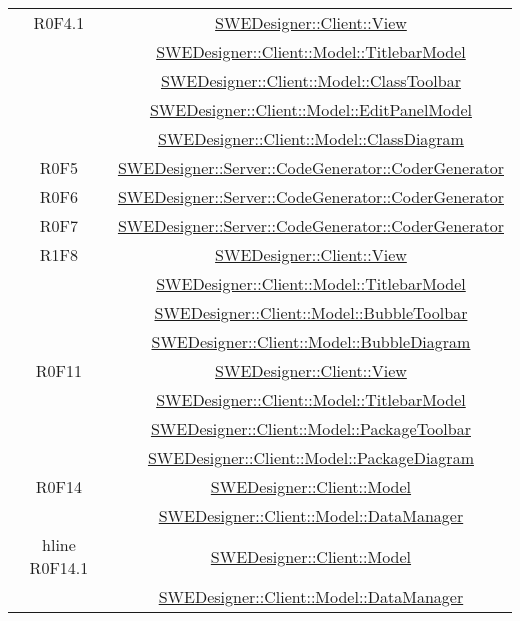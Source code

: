 \documentclass[../SpecificaTecnica.tex]{subfiles}
\begin{document}
\begin{longtable}{|c|c|}
		R0F4.1 & \hyperlink{SWEDesigner::Client::View}{SWEDesigner::Client::View} \\& \hyperlink{SWEDesigner::Client::Model::TitlebarModel}{SWEDesigner::Client::Model::TitlebarModel} \\& \hyperlink{SWEDesigner::Client::Model::ClassToolbar}{SWEDesigner::Client::Model::ClassToolbar} \\& \hyperlink{SWEDesigner::Client::Model::EditPanelModel}{SWEDesigner::Client::Model::EditPanelModel} \\& \hyperlink{SWEDesigner::Client::Model::ClassDiagram}{SWEDesigner::Client::Model::ClassDiagram}\\\hline
		R0F5 & \hyperlink{SWEDesigner::Server::CodeGenerator::CoderGenerator}{SWEDesigner::Server::CodeGenerator::CoderGenerator} \\\hline
		R0F6 & \hyperlink{SWEDesigner::Server::CodeGenerator::CoderGenerator}{SWEDesigner::Server::CodeGenerator::CoderGenerator}\\\hline
		R0F7 & \hyperlink{SWEDesigner::Server::CodeGenerator::CoderGenerator}{SWEDesigner::Server::CodeGenerator::CoderGenerator}\\\hline
		R1F8 & \hyperlink{SWEDesigner::Client::View}{SWEDesigner::Client::View} \\& \hyperlink{SWEDesigner::Client::Model::TitlebarModel}{SWEDesigner::Client::Model::TitlebarModel} \\& \hyperlink{SWEDesigner::Client::Model::BubbleToolbar}{SWEDesigner::Client::Model::BubbleToolbar} \\& \hyperlink{SWEDesigner::Client::Model::BubbleDiagram}{SWEDesigner::Client::Model::BubbleDiagram} \\\hline
		R0F11 & \hyperlink{SWEDesigner::Client::View}{SWEDesigner::Client::View} \\& \hyperlink{SWEDesigner::Client::Model::TitlebarModel}{SWEDesigner::Client::Model::TitlebarModel} \\& \hyperlink{SWEDesigner::Client::Model::PackageToolbar}{SWEDesigner::Client::Model::PackageToolbar} \\& \hyperlink{SWEDesigner::Client::Model::PackageDiagram}{SWEDesigner::Client::Model::PackageDiagram} \\\hline
		R0F14 & \hyperlink{SWEDesigner::Client::Model}{SWEDesigner::Client::Model} \\& \hyperlink{SWEDesigner::Client::Model::DataManager}{SWEDesigner::Client::Model::DataManager}\\hline
		R0F14.1 & \hyperlink{SWEDesigner::Client::Model}{SWEDesigner::Client::Model} \\& \hyperlink{SWEDesigner::Client::Model::DataManager}{SWEDesigner::Client::Model::DataManager}\\\hline

\end{longtable}
\end{document}
